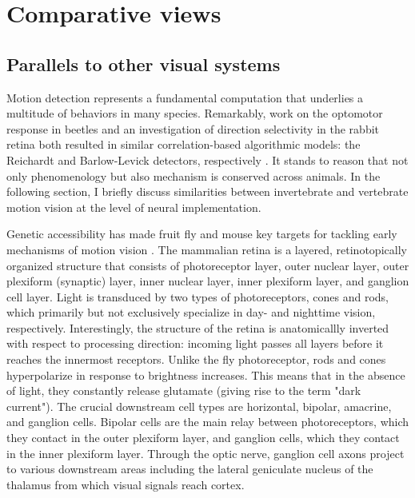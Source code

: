 \section{Comparative views}
\subsection{Parallels to other visual systems}
Motion detection represents a fundamental computation that underlies a multitude of behaviors in many species. Remarkably, work on the optomotor response in beetles and an investigation of direction selectivity in the rabbit retina both resulted in similar correlation-based algorithmic models: the Reichardt and Barlow-Levick detectors, respectively \citep{Hassenstein:1956fa,Barlow:1965aa}. It stands to reason that not only phenomenology but also mechanism is conserved across animals. In the following section, I briefly discuss similarities between invertebrate and vertebrate motion vision at the level of neural implementation.

Genetic accessibility has made fruit fly and mouse key targets for tackling early mechanisms of motion vision \citep[for thorough reviews, see][]{Borst:2015ko,Euler:2014aa}. The mammalian retina is a layered, retinotopically organized structure that consists of photoreceptor layer, outer nuclear layer, outer plexiform (synaptic) layer, inner nuclear layer, inner plexiform layer, and ganglion cell layer. Light is transduced by two types of photoreceptors, cones and rods, which primarily but not exclusively specialize in day- and nighttime vision, respectively. Interestingly, the structure of the retina is anatomicallly inverted with respect to processing direction: incoming light passes all layers before it reaches the innermost receptors. Unlike the fly photoreceptor, rods and cones hyperpolarize in response to brightness increases. This means that in the absence of light, they constantly release glutamate (giving rise to the term "dark current"). The crucial downstream cell types are horizontal, bipolar, amacrine, and ganglion cells. Bipolar cells are the main relay between photoreceptors, which they contact in the outer plexiform layer, and ganglion cells, which they contact in the inner plexiform layer. Through the optic nerve, ganglion cell axons project to various downstream areas including the lateral geniculate nucleus of the thalamus from which visual signals reach cortex.

